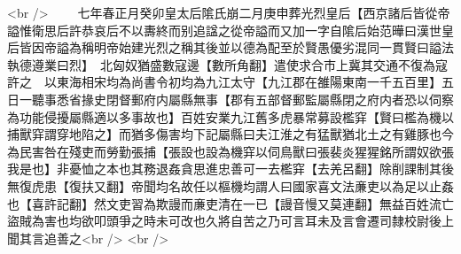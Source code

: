 <br />
　　七年春正月癸卯皇太后隂氏崩二月庚申葬光烈皇后【西京諸后皆從帝謚惟衛思后許恭哀后不以夀終而别追諡之從帝謚而又加一字自隂后始范曄曰漢世皇后皆因帝謚為稱明帝始建光烈之稱其後並以德為配至於賢愚優劣混同一貫賢曰謚法執德遵業曰烈】　北匈奴猶盛數寇邊【數所角翻】遣使求合市上冀其交通不復為寇許之　以東海相宋均為尚書令初均為九江太守【九江郡在雒陽東南一千五百里】五日一聽事悉省掾史閉督郵府内屬縣無事【郡有五部督郵監屬縣閉之府内者恐以伺察為功能侵擾屬縣適以多事故也】百姓安業九江舊多虎暴常募設檻穽【賢曰檻為機以捕獸穽謂穿地陷之】而猶多傷害均下記屬縣曰夫江淮之有猛獸猶北土之有雞豚也今為民害咎在殘吏而勞勤張捕【張設也設為機穽以伺鳥獸曰張裴炎猩猩銘所謂奴欲張我是也】非憂恤之本也其務退姦貪思進忠善可一去檻穽【去羌呂翻】除削課制其後無復虎患【復扶又翻】帝聞均名故任以樞機均謂人曰國家喜文法亷吏以為足以止姦也【喜許記翻】然文吏習為欺謾而亷吏清在一已【謾音慢又莫連翻】無益百姓流亡盜賊為害也均欲叩頭爭之時未可改也久將自苦之乃可言耳未及言會遷司隸校尉後上聞其言追善之<br />
<br />
